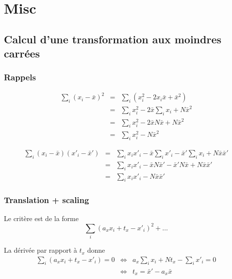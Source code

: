 

\chapter{Misc}

\section{Calcul d'une transformation aux moindres carrées}

\subsection{Rappels}
\begin{eqnarray*}
\sum_i \left( x_i - \bar{x} \right)^2 
& = &
\sum_i \left( x_i^2 - 2 x_i \bar{x} + \bar{x}^2 \right) \\
& = &
\sum_i x_i^2 - 2 \bar{x} \sum_i x_i + N \bar{x}^2 \\
& = &
\sum_i x_i^2 - 2 \bar{x} N \bar{x} + N \bar{x}^2 \\
& = &
\sum_i x_i^2 - N \bar{x}^2 
\end{eqnarray*}

\begin{eqnarray*}
\sum_i \left( x_i - \bar{x} \right) \left( x'_i - \bar{x}' \right) 
& = &
\sum_i x_i x'_i - \bar{x} \sum_i x'_i - \bar{x}' \sum_i x_i + N \bar{x} \bar{x}' \\
& = &
\sum_i x_i x'_i - \bar{x} N \bar{x}' - \bar{x}' N \bar{x} + N \bar{x} \bar{x}' \\
& = &
\sum_i x_i x'_i - N \bar{x} \bar{x}'
\end{eqnarray*}

\subsection{Translation + scaling}

Le crit\`ere est de la forme
$$
\sum_i \left( a_x x_i + t_x - x'_i \right)^2 + \ldots
$$

La d\'eriv\'ee par rapport \`a $t_x$ donne
\begin{eqnarray*}
\sum_i \left( a_x x_i + t_x - x'_i \right) = 0
& \Longleftrightarrow &
a_x \sum_i x_i + N t_x - \sum_i x'_i = 0 \\
& \Longleftrightarrow &
t_x = \bar{x}' - a_x \bar{x} 
\end{eqnarray*}

